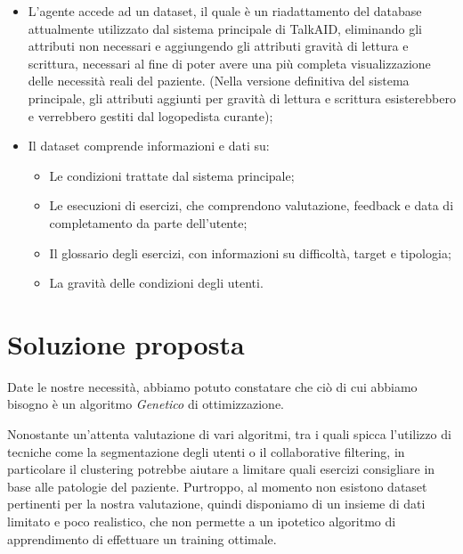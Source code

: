 \documentclass{article}
\begin{document}
    \begin{itemize}
        \item L'agente accede ad un dataset, il quale è un riadattamento del database attualmente utilizzato dal sistema principale di TalkAID, eliminando gli attributi non necessari e aggiungendo gli attributi gravità di lettura e scrittura, necessari al fine di poter avere una più completa visualizzazione delle necessità reali del paziente. (Nella versione definitiva del sistema principale, gli attributi aggiunti per gravità di lettura e scrittura esisterebbero e verrebbero gestiti dal logopedista curante);
        
        \item Il dataset comprende informazioni e dati su:
            \begin{itemize}
                \item Le condizioni trattate dal sistema principale;
                \item Le esecuzioni di esercizi, che comprendono valutazione, feedback e data di completamento da parte dell'utente;
                \item Il glossario degli esercizi, con informazioni su difficoltà, target e tipologia;
                \item La gravità delle condizioni degli utenti.
            \end{itemize}

        

    \end{itemize}

    \pagebreak

    \section{Soluzione proposta}

    Date le nostre necessità, abbiamo potuto constatare che ciò di cui abbiamo bisogno è un algoritmo \textit{Genetico} di ottimizzazione.

    Nonostante un'attenta valutazione di vari algoritmi, tra i quali spicca l'utilizzo di tecniche come la segmentazione degli utenti o il collaborative filtering, in particolare il clustering potrebbe aiutare a limitare quali esercizi consigliare in base alle patologie del paziente. Purtroppo, al momento non esistono dataset pertinenti per la nostra valutazione, quindi disponiamo di un insieme di dati limitato e poco realistico, che non permette a un ipotetico algoritmo di apprendimento di effettuare un training ottimale.
\end{document}
